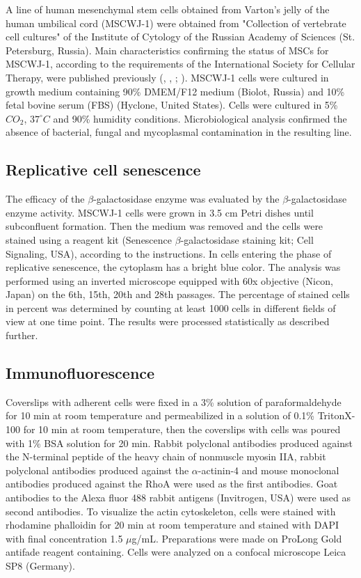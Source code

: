 \documentclass[alpha-refs]{wiley-article}
\begin{document}
A line of human mesenchymal stem cells obtained from Varton's jelly of the human umbilical cord (MSCWJ-1) were obtained from "Collection of vertebrate cell cultures" of the Institute of Cytology of the Russian Academy of Sciences (St. Petersburg, Russia).
Main characteristics confirming the status of MSCs for MSCWJ-1, according to the requirements of the International Society for Cellular Therapy, were published previously (\cite{krylova2017derivation}, \cite{koltsova2018dynamics}, \cite{dominici2006minimal}; \cite{sensebe2010mesenchymal}).
MSCWJ-1 cells were cultured in growth medium containing 90\% DMEM/F12 medium (Biolot, Russia) and 10\% fetal bovine serum (FBS) (Hyclone, United States).
Cells were cultured in 5\% $CO_2$, $37^{\circ}  C$ and 90\% humidity conditions.
Microbiological analysis confirmed the absence of bacterial, fungal and mycoplasmal contamination in the resulting line.

\subsection{Replicative cell senescence}

The efficacy of the $\beta$-galactosidase enzyme was evaluated by the $\beta$-galactosidase enzyme activity.
MSCWJ-1 cells were grown in 3.5 cm Petri dishes until subconfluent formation.
Then the medium was removed and the cells were stained using a reagent kit (Senescence $\beta$-galactosidase staining kit; Cell Signaling, USA), according to the instructions.
In cells entering the phase of replicative senescence, the cytoplasm has a bright blue color.
The analysis was performed using an inverted microscope equipped with 60x objective (Nicon, Japan) on the 6th, 15th, 20th and 28th passages.
The percentage of stained cells in percent was determined by counting at least 1000 cells in different fields of view at one time point.
The results were processed statistically as described further.

\subsection{Immunofluorescence}

Coverslips with adherent cells were fixed in a 3\% solution of paraformaldehyde for 10 min at room temperature and permeabilized in a solution of 0.1\% TritonX-100 for 10 min at room temperature, then the coverslips with cells was poured with 1\% BSA solution for 20 min.
Rabbit polyclonal antibodies produced against the N-terminal peptide of the heavy chain of nonmuscle myosin IIA, rabbit polyclonal antibodies produced against the $\alpha$-actinin-4 and mouse monoclonal antibodies produced against the RhoA were used as the first antibodies.
Goat antibodies to the Alexa fluor 488 rabbit antigens (Invitrogen, USA) were used as second antibodies.
To visualize the actin cytoskeleton, cells were stained with rhodamine phalloidin for 20 min at room temperature and stained with DAPI with final concentration 1.5 $\mu$g/mL.
Preparations were made on ProLong Gold antifade reagent containing.
Cells were analyzed on a confocal microscope Leica SP8 (Germany).
\end{document}
